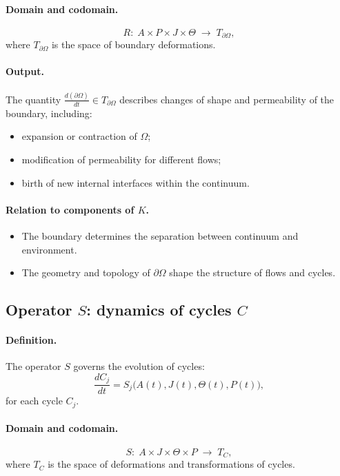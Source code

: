 \paragraph{Domain and codomain.}
\[
  R:\; A\times P\times J\times\Theta \;\longrightarrow\; T_{\partial\Omega},
\]
where \(T_{\partial\Omega}\) is the space of boundary deformations.

\paragraph{Output.}
The quantity \(\frac{d(\partial\Omega)}{dt}\in T_{\partial\Omega}\) describes changes of shape and permeability of the boundary, including:
\begin{itemize}
  \item expansion or contraction of \(\Omega\);
  \item modification of permeability for different flows;
  \item birth of new internal interfaces within the continuum.
\end{itemize}

\paragraph{Relation to components of \texorpdfstring{\(K\)}{K}.}
\begin{itemize}
  \item The boundary determines the separation between continuum and environment.
  \item The geometry and topology of \(\partial\Omega\) shape the structure of flows and cycles.
\end{itemize}

\subsection{Operator \texorpdfstring{\(S\)}{S}: dynamics of cycles \texorpdfstring{\(C\)}{C}}

\paragraph{Definition.}
The operator \(S\) governs the evolution of cycles:
\[
  \frac{dC_j}{dt} = S_j\bigl(A(t),J(t),\Theta(t),P(t)\bigr),
\]
for each cycle \(C_j\).

\paragraph{Domain and codomain.}
\[
  S:\; A\times J\times\Theta\times P \;\longrightarrow\; T_C,
\]
where \(T_C\) is the space of deformations and transformations of cycles.

